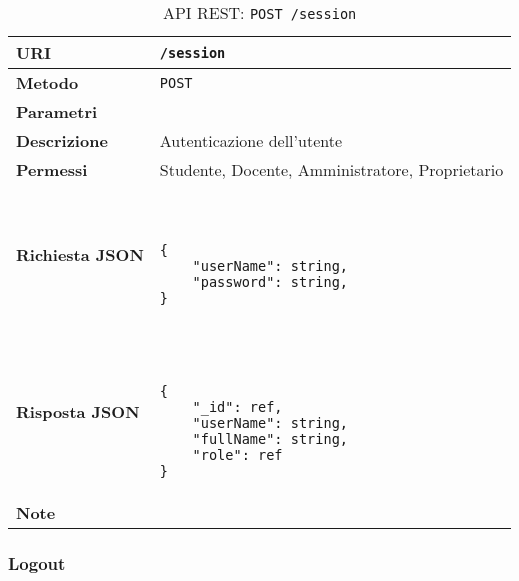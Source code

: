         \begin{table}[H]
            \begin{center}
                \begin{tabular}{p{} p{}}
                    \toprule
                    \textbf{URI} & \texttt{/session} \\ \midrule
                    \textbf{Metodo} & \texttt{POST} \\ \midrule
                    \textbf{Parametri} & \\ \midrule
                    \textbf{Descrizione} & Autenticazione dell'utente \\ \midrule
                    \textbf{Permessi} & Studente, Docente, Amministratore, Proprietario  \\ \midrule
                    \textbf{Richiesta JSON} & \
                        \begin{lstlisting}[basicstyle={\ttfamily}]
{
    "userName": string,
    "password": string,
}
                        \end{lstlisting}
                        \\ \midrule
                    \textbf{Risposta JSON} & \
                        \begin{lstlisting}[basicstyle={\ttfamily}]
{
	"_id": ref,
	"userName": string,
	"fullName": string,
	"role": ref
}
                        \end{lstlisting}
                    	\\ \midrule
                    \textbf{Note} & \\
                    \bottomrule
                \end{tabular}
                \caption{API REST: \texttt{POST /session}}
            \end{center}
        \end{table}

    \subsubsection{Logout}

